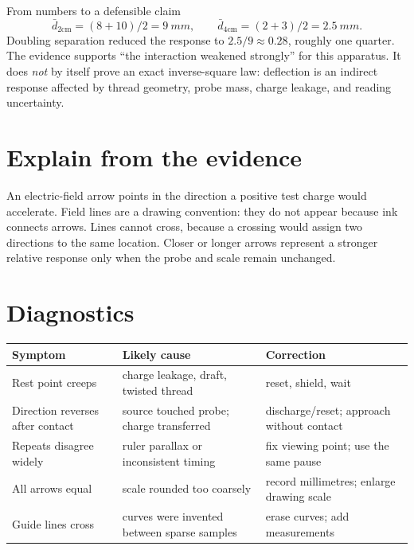 \begin{teloscard}{From numbers to a defensible claim}
\[
\bar d_{2\mathrm{cm}}=(8+10)/2=\qty{9}{mm},\qquad
\bar d_{4\mathrm{cm}}=(2+3)/2=\qty{2.5}{mm}.
\]
Doubling separation reduced the response to \(2.5/9\approx0.28\), roughly one
quarter. The evidence supports ``the interaction weakened strongly'' for this
apparatus. It does \emph{not} by itself prove an exact inverse-square law:
deflection is an indirect response affected by thread geometry, probe mass,
charge leakage, and reading uncertainty.
\end{teloscard}

\section{Explain from the evidence}
An electric-field arrow points in the direction a positive test charge would
accelerate. Field lines are a drawing convention: they do not appear because
ink connects arrows. Lines cannot cross, because a crossing would assign two
directions to the same location. Closer or longer arrows represent a stronger
relative response only when the probe and scale remain unchanged.

\section{Diagnostics}
\begin{tabularx}{\linewidth}{@{}p{.24\linewidth}L L@{}}
\toprule
Symptom & Likely cause & Correction\\
\midrule
Rest point creeps & charge leakage, draft, twisted thread & reset, shield, wait\\
Direction reverses after contact & source touched probe; charge transferred & discharge/reset; approach without contact\\
Repeats disagree widely & ruler parallax or inconsistent timing & fix viewing point; use the same pause\\
All arrows equal & scale rounded too coarsely & record millimetres; enlarge drawing scale\\
Guide lines cross & curves were invented between sparse samples & erase curves; add measurements\\
\bottomrule
\end{tabularx}

